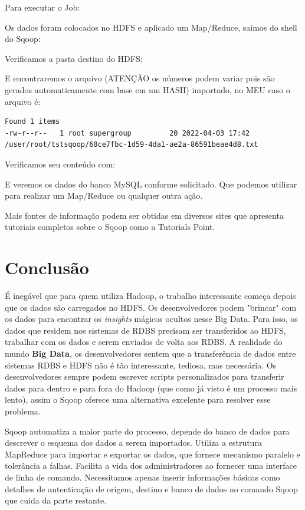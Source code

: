 \documentclass[a4paper,11pt]{article}
\begin{document}
Para executar o Job: \\

Os dados foram colocados no HDFS e aplicado um Map/Reduce, saímos do shell do Sqoop: \\

Verificamos a pasta destino do HDFS: \\

E encontraremos o arquivo (ATENÇÃO os números podem variar pois são gerados automaticamente com base em um HASH) importado, no MEU caso o arquivo é:
\begin{lstlisting}[]
Found 1 items
-rw-r--r--   1 root supergroup         20 2022-04-03 17:42 /user/root/tstsqoop/60ce7fbc-1d59-4da1-ae2a-86591beae4d8.txt
\end{lstlisting}

Verificamos seu conteúdo com: \\

E veremos os dados do banco MySQL conforme solicitado. Que podemos utilizar para realizar um Map/Reduce ou qualquer outra ação.

Mais fontes de informação podem ser obtidas em diversos sites que apresenta tutoriais completos sobre o Sqoop como a Tutorials Point\cite{tutorialspoint}.

\section{Conclusão}
É inegável que para quem utiliza Hadoop, o trabalho interessante começa depois que os dados são carregados no HDFS. Os desenvolvedores podem "brincar" com os dados para encontrar os \textit{insights} mágicos ocultos nesse Big Data. Para isso, os dados que residem nos sistemas de RDBS precisam ser transferidos ao HDFS, trabalhar com os dados e serem enviados de volta aos RDBS. A realidade do mundo \textbf{Big Data}, os desenvolvedores sentem que a transferência de dados entre sistemas RDBS e HDFS não é tão interessante, tediosa, mas necessária. Os desenvolvedores sempre podem escrever scripts personalizados para transferir dados para dentro e para fora do Hadoop (que como já visto é um processo mais lento), assim o Sqoop oferece uma alternativa excelente para resolver esse problema.

Sqoop automatiza a maior parte do processo, depende do banco de dados para descrever o esquema dos dados a serem importados. Utiliza a estrutura MapReduce para importar e exportar os dados, que fornece mecanismo paralelo e tolerância a falhas. Facilita a vida dos administradores ao fornecer uma interface de linha de comando. Necessitamos apenas inserir informações básicas como detalhes de autenticação de origem, destino e banco de dados no comando Sqoop que cuida da parte restante. 
\end{document}
